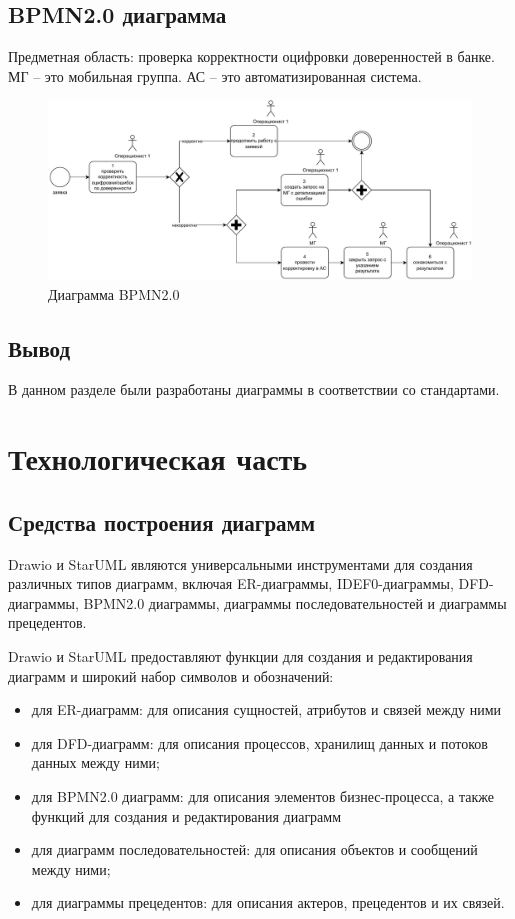 \documentclass[12pt]{report}
\begin{document}
\newpage
\section{BPMN2.0 диаграмма}
Предметная область: проверка корректности оцифровки доверенностей в банке.
МГ -- это мобильная группа. 
АС -- это автоматизированная система.

\begin{figure}[h]
  \centering
  \includegraphics[width= \linewidth]{bpmn.pdf}
  \caption{Диаграмма BPMN2.0}
  \label{fig:mc}
\end{figure}

\section*{Вывод}
В данном разделе были разработаны диаграммы в соответствии со стандартами.

\chapter{Технологическая часть}


\section{Средства построения диаграмм}
Drawio и StarUML являются универсальными инструментами для создания различных типов диаграмм, включая ER-диаграммы, IDEF0-диаграммы, DFD-диаграммы, BPMN2.0 диаграммы, диаграммы последовательностей и диаграммы прецедентов.

Drawio и StarUML предоставляют функции для создания и редактирования диаграмм и широкий набор символов и обозначений:
\begin{itemize}
    \item для ER-диаграмм: для описания сущностей, атрибутов и связей между ними
    \item для DFD-диаграмм: для описания процессов, хранилищ данных и потоков данных между ними;
    \item для BPMN2.0 диаграмм: для описания элементов бизнес-процесса, а также функций для создания и редактирования диаграмм
    \item для диаграмм последовательностей: для описания объектов и сообщений между ними;
    \item для диаграммы прецедентов: для описания актеров, прецедентов и их связей.
\end{itemize}
\end{document}
